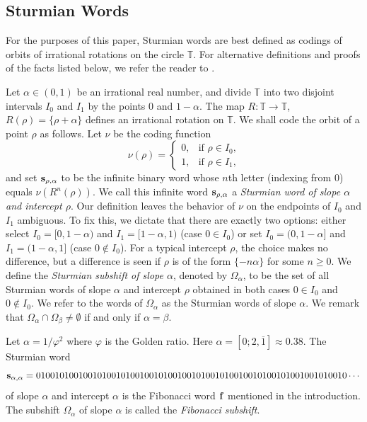 \documentclass[a4paper,fleqn]{article}
\newcommand{\infw}[1]{%
  \ifcat\noexpand#1\relax\bm{#1}%
  \else\mathbf{#1}\fi}          %
\newcommand{\T}{\mathbb{T}}
\begin{document}
  \subsection{Sturmian Words}
  For the purposes of this paper, Sturmian words are best defined as codings of orbits of irrational rotations on the
  circle $\T$. For alternative definitions and proofs of the facts listed below, we refer the reader to
  \cite{2002:algebraic_combinatorics_on_words,2002:substitutions_in_dynamics_arithmetics_and_combinatorics}.

  Let $\alpha \in (0, 1)$ be an irrational real number, and divide $\T$ into two disjoint intervals $I_0$ and $I_1$ by
  the points $0$ and $1 - \alpha$. The map $R\colon \T \to \T$, $R(\rho) = \{\rho + \alpha\}$ defines an irrational
  rotation on $\T$. We shall code the orbit of a point $\rho$ as follows. Let $\nu$ be the coding function
  \begin{equation*}
    \nu(\rho) = \begin{cases}
                  0, &\text{if $\rho \in I_0$,} \\
                  1, &\text{if $\rho \in I_1$,}
                \end{cases}
  \end{equation*}
  and set $\infw{s}_{\rho,\alpha}$ to be the infinite binary word whose $n$th letter (indexing from $0$) equals
  $\nu(R^n(\rho))$. We call this infinite word $\infw{s}_{\rho,\alpha}$ a \emph{Sturmian word of slope $\alpha$ and
  intercept $\rho$}. Our definition leaves the behavior of $\nu$ on the endpoints of $I_0$ and $I_1$ ambiguous. To fix
  this, we dictate that there are exactly two options: either select $I_0 = [0, 1-\alpha)$ and $I_1 = [1-\alpha, 1)$
  (case $0 \in I_0$) or set $I_0 = (0, 1-\alpha]$ and $I_1 = (1-\alpha, 1]$ (case $0 \notin I_0$). For a typical
  intercept $\rho$, the choice makes no difference, but a difference is seen if $\rho$ is of the form $\{-n\alpha\}$
  for some $n \geq 0$. We define the \emph{Sturmian subshift of slope $\alpha$}, denoted by $\Omega_\alpha$, to be the
  set of all Sturmian words of slope $\alpha$ and intercept $\rho$ obtained in both cases $0 \in I_0$ and $0 \notin I_0$.
  We refer to the words of $\Omega_\alpha$ as the Sturmian words of slope $\alpha$. We remark that
  $\Omega_\alpha \cap \Omega_\beta \neq \emptyset$ if and only if $\alpha = \beta$.

  \begin{example}
    Let $\alpha = 1/\varphi^2$ where $\varphi$ is the Golden ratio. Here $\alpha = [0; 2, \overline{1}] \approx 0.38$.
    The Sturmian word
    \begin{equation*}
      \infw{s}_{\alpha,\alpha} = 010010100100101001010010010100100101001010010010100101001001010010 \cdots
    \end{equation*}
    of slope $\alpha$ and intercept $\alpha$ is the Fibonacci word $\infw{f}$ mentioned in the introduction. The
    subshift $\Omega_\alpha$ of slope $\alpha$ is called the \emph{Fibonacci subshift}.
  \end{example}
\end{document}

